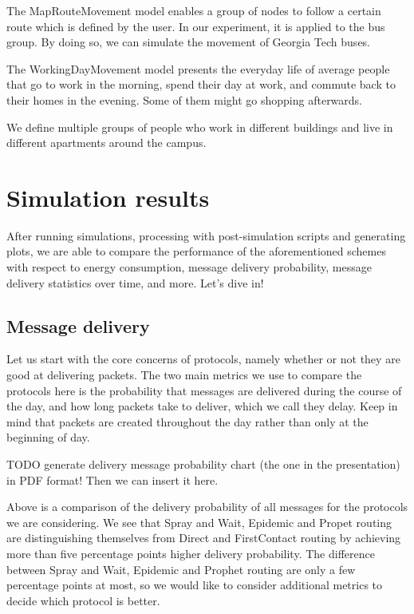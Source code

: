 \documentclass[conference]{IEEEtran}
\begin{document}
The MapRouteMovement model enables a group of nodes to follow a certain route which is defined by the user. In our experiment, it is applied to the bus group. By doing so, we can simulate the movement of Georgia Tech buses.

The WorkingDayMovement model presents the everyday life of average people that go to work in the morning, spend their day at work, and commute back to their homes in the evening. Some of them might go shopping afterwards.

We define multiple groups of people who work in different buildings and live in different apartments around the campus.

\section{Simulation results}

After running simulations, processing with post-simulation scripts and generating plots, we are able to compare the performance of the aforementioned schemes with respect to energy consumption, message delivery probability, message delivery statistics over time, and more. Let's dive in!

\subsection{Message delivery}

Let us start with the core concerns of protocols, namely whether or not they are good at delivering packets. The two main metrics we use to compare the protocols here is the probability that messages are delivered during the course of the day, and how long packets take to deliver, which we call they delay. Keep in mind that packets are created throughout the day rather than only at the beginning of day.

{\color{red}
  TODO generate delivery message probability chart (the one in the presentation) in PDF format! Then we can insert it here.
}

Above is a comparison of the delivery probability of all messages for the protocols we are considering. We see that Spray and Wait, Epidemic and Propet routing are distinguishing themselves from Direct and FirstContact routing by achieving more than five percentage points higher delivery probability. The difference between Spray and Wait, Epidemic and Prophet routing are only a few percentage points at most, so we would like to consider additional metrics to decide which protocol is better.
\end{document}
